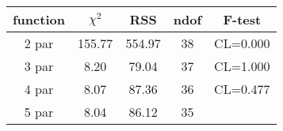 \begin{tabular}{c|c|c|c|c}
function & $\chi^2$ & RSS & ndof & F-test \\
\hline
2 par & 155.77 & 554.97 & 38 & CL=0.000 \\
3 par & 8.20 & 79.04 & 37 & CL=1.000 \\
4 par & 8.07 & 87.36 & 36 & CL=0.477 \\
5 par & 8.04 & 86.12 & 35 & \\
\hline
\end{tabular}